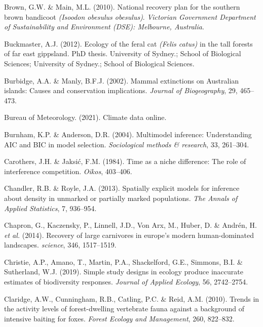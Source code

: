 \documentclass[11pt,a4paper,titlepage,twoside,openright]{style/unimelbthesis}
\begin{document}
\begin{mainmatter}
\leavevmode\hypertarget{ref-brown2010national}{}%
Brown, G.W. \& Main, M.L. (2010). National recovery plan for the southern brown bandicoot \emph{(Isoodon obesulus obesulus)}. \emph{Victorian Government Department of Sustainability and Environment (DSE): Melbourne, Australia}.

\leavevmode\hypertarget{ref-buckmaster2012ecology}{}%
Buckmaster, A.J. (2012). Ecology of the feral cat \emph{(Felis catus)} in the tall forests of far east gippsland. PhD thesis. University of Sydney.; School of Biological Sciences; University of Sydney.; School of Biological Sciences.

\leavevmode\hypertarget{ref-burbidge2002mammal}{}%
Burbidge, A.A. \& Manly, B.F.J. (2002). Mammal extinctions on Australian islands: Causes and conservation implications. \emph{Journal of Biogeography}, 29, 465--473.

\leavevmode\hypertarget{ref-BOM2021}{}%
Bureau of Meteorology. (2021). Climate data online.

\leavevmode\hypertarget{ref-burnham2004multimodel}{}%
Burnham, K.P. \& Anderson, D.R. (2004). Multimodel inference: Understanding AIC and BIC in model selection. \emph{Sociological methods \& research}, 33, 261--304.

\leavevmode\hypertarget{ref-carothers1984time}{}%
Carothers, J.H. \& Jaksić, F.M. (1984). Time as a niche difference: The role of interference competition. \emph{Oikos}, 403--406.

\leavevmode\hypertarget{ref-chandler2013spatially}{}%
Chandler, R.B. \& Royle, J.A. (2013). Spatially explicit models for inference about density in unmarked or partially marked populations. \emph{The Annals of Applied Statistics}, 7, 936--954.

\leavevmode\hypertarget{ref-chapron2014recovery}{}%
Chapron, G., Kaczensky, P., Linnell, J.D., Von Arx, M., Huber, D. \& Andrén, H. \emph{et al.} (2014). Recovery of large carnivores in europe's modern human-dominated landscapes. \emph{science}, 346, 1517--1519.

\leavevmode\hypertarget{ref-christie2019simple}{}%
Christie, A.P., Amano, T., Martin, P.A., Shackelford, G.E., Simmons, B.I. \& Sutherland, W.J. (2019). Simple study designs in ecology produce inaccurate estimates of biodiversity responses. \emph{Journal of Applied Ecology}, 56, 2742--2754.

\leavevmode\hypertarget{ref-claridge2010trends}{}%
Claridge, A.W., Cunningham, R.B., Catling, P.C. \& Reid, A.M. (2010). Trends in the activity levels of forest-dwelling vertebrate fauna against a background of intensive baiting for foxes. \emph{Forest Ecology and Management}, 260, 822--832.


\end{mainmatter}
\end{document}
